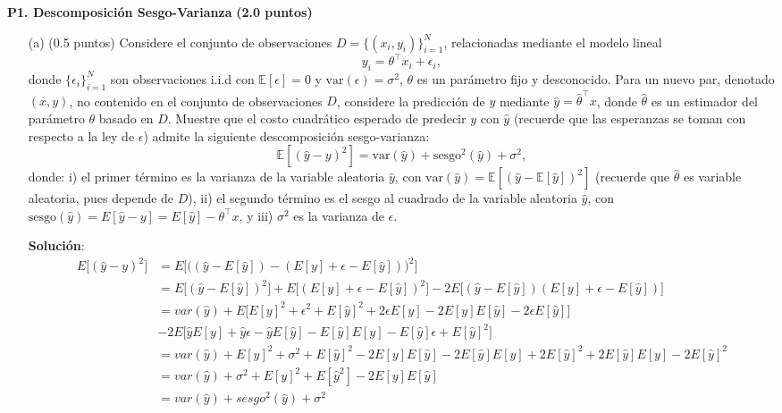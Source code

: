 \documentclass[11pt,letterpaper]{article}
\begin{document}
\noindent\textbf{P1. Descomposición Sesgo-Varianza} \textbf{(2.0 puntos)}
\vspace{5 mm}
\begin{itemize}
    \item[(a)] (0.5 puntos) Considere el conjunto de  observaciones  $D=\{(x_{i}, y_{i})\}_{i=1}^{N}$, relacionadas mediante el modelo lineal  
    	\begin{equation*}
    	    y_{i}=\theta^\top x_{i}+\epsilon_{i},
    	\end{equation*}
    	 donde $\{\epsilon_{i}\}_{i=1}^N$ son observaciones i.i.d con $\mathbb{E}[\epsilon]=0$ y $\text{var}(\epsilon)=\sigma^{2}$,  $\theta$ es un parámetro fijo y desconocido. Para un nuevo par, denotado $(x,y)$, no contenido en el conjunto de observaciones $D$, considere la predicción de $y$ mediante $\hat y=\hat\theta^\top x$, donde $\hat{\theta}$ es un estimador del  parámetro $\theta$ basado en $D$. Muestre que el costo cuadrático esperado de predecir $y$  con $\hat y$ (recuerde que las esperanzas se toman con   respecto a la ley de $\epsilon$) admite la siguiente  descomposición sesgo-varianza:
    	\begin{equation*}
    	    \mathbb{E}\left[(\hat{y}-y)^{2}\right] = \text{var}(\hat{y})+\text{sesgo}^{2}(\hat{y}) + \sigma^{2},
    	\end{equation*}
        donde: i) el primer término es la varianza de la variable aleatoria $\hat y$, con $\text{var}(\hat{y})=\mathbb{E}\left[(\hat{y}-\mathbb{E}[\hat{y}])^{2}\right]$ (recuerde que $\hat\theta$ es variable aleatoria, pues depende de $D$), ii) el segundo término es el sesgo al cuadrado de la variable aleatoria $\hat{y}$, con $\text{sesgo}(\hat{y})=E\left[\hat{y}-y\right]=E\left[\hat{y}\right]- \theta^\top x$, y  iii) $\sigma^2$ es la varianza de $\epsilon$.

    \textbf{Solución}:\\
      
    \begin{align*}
        E\big[(\hat{y}-y)^{2}\big]&=E\big[\big((\hat{y}-E[\hat{y}])-(E[y]+\epsilon-E[\hat{y}])\big)^{2}\big] \\
        & = E\big[(\hat{y}-E[\hat{y}])^{2}\big]+E\big[(E[y]+\epsilon-E[\hat{y}])^{2}\big]-2E\big[(\hat{y}-E[\hat{y}])(E[y]+\epsilon-E[\hat{y}])\big]\\
        & = var(\hat{y})+E\big[E[y]^{2}+\epsilon^{2}+E[\hat{y}]^{2}+2\epsilon E[y]-2E[y]E[\hat{y}]-2\epsilon E[\hat{y}]\big]\\
        & - 2E\big[\hat{y}E[y]+\hat{y}\epsilon-\hat{y}E[\hat{y}]-E[\hat{y}]E[y]-E[\hat{y}]\epsilon+E[\hat{y}]^{2}\big]\\
        & = var(\hat{y})+E[y]^{2}+\sigma^{2}+E[\hat{y}]^{2}-2E[y]E[\hat{y}]-2E[\hat{y}]E[y]+2E[\hat{y}]^{2}+2E[\hat{y}]E[y]-2E[\hat{y}]^{2}\\
        & = var(\hat{y})+\sigma^{2}+E[y]^{2}+E[\hat{y}^{2}]-2E[y]E[\hat{y}]\\
        & = var(\hat{y})+sesgo^{2}(\hat{y})+\sigma^{2}
    \end{align*}


\end{itemize}
\end{document}
